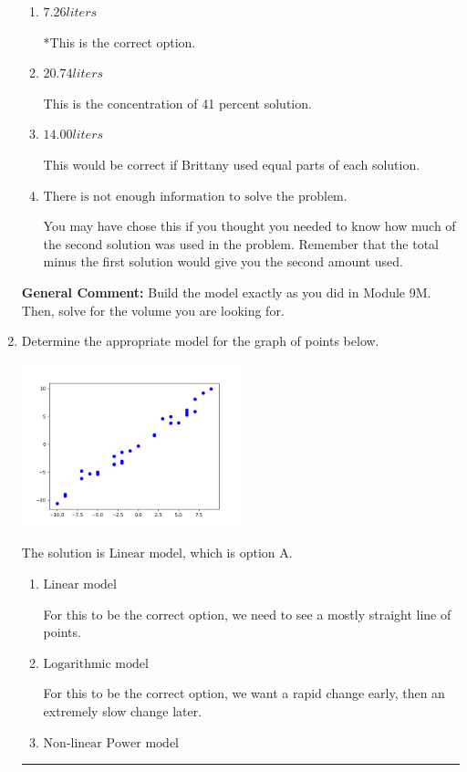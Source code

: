 \documentclass{extbook}[14pt]
\newcommand{\litem}[1]{\item #1

\rule{\textwidth}{0.4pt}}
\begin{document}
\begin{enumerate}
{\begin{enumerate}[label=\Alph*.]
This was a random value. If this was not a guess, contact the coordinator to talk about how you got this value.
\item \( 7.26 liters \)

*This is the correct option.
\item \( 20.74 liters \)

This is the concentration of 41 percent solution.
\item \( 14.00 liters \)

This would be correct if Brittany used equal parts of each solution.
\item \( \text{There is not enough information to solve the problem.} \)

You may have chose this if you thought you needed to know how much of the second solution was used in the problem. Remember that the total minus the first solution would give you the second amount used.
\end{enumerate}

\textbf{General Comment:} Build the model exactly as you did in Module 9M. Then, solve for the volume you are looking for.
}
\litem{
Determine the appropriate model for the graph of points below.

\begin{center}
    \includegraphics[width=0.5\textwidth]{../Figures/identifyModelGraph12C.png}
\end{center}


The solution is \( \text{Linear model} \), which is option A.\begin{enumerate}[label=\Alph*.]
\item \( \text{Linear model} \)

For this to be the correct option, we need to see a mostly straight line of points.
\item \( \text{Logarithmic model} \)

For this to be the correct option, we want a rapid change early, then an extremely slow change later.
\item \( \text{Non-linear Power model} \)


\end{enumerate}}
\end{enumerate}
\end{document}

